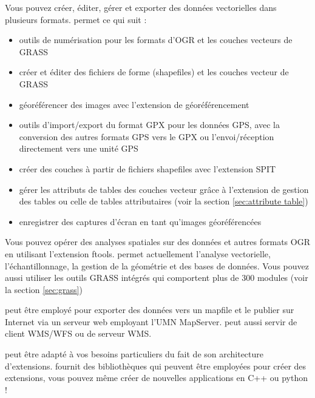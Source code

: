 
Vous pouvez créer, éditer, gérer et exporter des données vectorielles dans plusieurs formats. \qg permet ce qui suit :

\begin{itemize}[label=--]
\item outils de numérisation pour les formats d'OGR et les couches vecteurs de GRASS
\item créer et éditer des fichiers de forme (shapefiles) et les couches vecteur de GRASS
\item géoréférencer des images avec l'extension de géoréférencement
\item outils d'import/export du format GPX pour les données GPS, avec la conversion des autres formats GPS vers le GPX ou l'envoi/réception directement vers une unité GPS
\item créer des couches \pg à partir de fichiers shapefiles avec l'extension SPIT
\item gérer les attributs de tables des couches vecteur grâce à l'extension de gestion des tables ou celle de tables attributaires (voir la section \ref{sec:attribute table})
\item enregistrer des captures d'écran en tant qu'images géoréférencées
\end{itemize}


Vous pouvez opérer des analyses spatiales sur des données \ppg et autres formats OGR en utilisant l'extension ftools. \qg permet actuellement l'analyse vectorielle, l'échantillonnage, la gestion de la géométrie et des bases de données. Vous pouvez aussi utiliser les outils GRASS intégrés qui comportent plus de 300 modules (voir la section \ref{sec:grass})


\qg peut être employé pour exporter des données vers un mapfile et le publier sur Internet via un serveur web employant l'UMN MapServer. \qg peut aussi servir de client WMS/WFS ou de serveur WMS.


\qg peut être adapté à vos besoins particuliers du fait de son architecture d'extensions. \qg fournit des bibliothèques qui peuvent être employées pour créer des extensions, vous pouvez même créer de nouvelles applications en C++ ou python !

